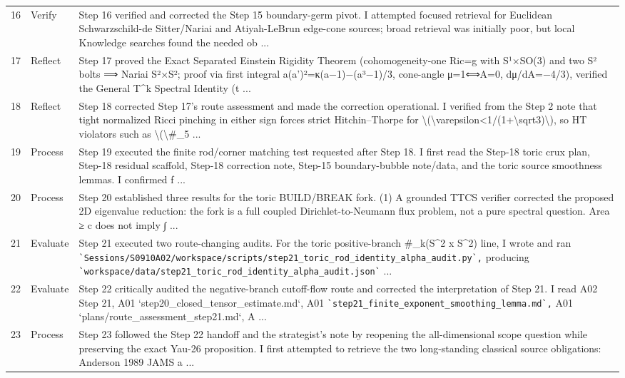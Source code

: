 \documentclass[UTF8,fontset=fandol,zihao=-4]{ctexart}
\begin{document}
\begin{longtable}{r p{} >{\raggedright\arraybackslash}p{}}
16 & Verify & Step 16 verified and corrected the Step 15 boundary-germ pivot. I attempted focused retrieval for Euclidean Schwarzschild-de Sitter/Nariai and Atiyah-LeBrun edge-cone sources; broad retrieval was initially poor, but local Knowledge searches found the needed ob ...\\
17 & Reflect & Step 17 proved the Exact Separated Einstein Rigidity Theorem (cohomogeneity-one Ric=g with S¹×SO(3) and two S² bolts ⟹ Nariai S²×S²; proof via first integral a(a')²=κ(a−1)−(a³−1)/3, cone-angle μ=1⟺A=0, dμ/dA=−4/3), verified the General T\textasciicircum{}k Spectral Identity (t ...\\
18 & Reflect & Step 18 corrected Step 17's route assessment and made the correction operational. I verified from the Step 2 note that tight normalized Ricci pinching in either sign forces strict Hitchin--Thorpe for \textbackslash{}(\textbackslash{}varepsilon<1/(1+\textbackslash{}sqrt3)\textbackslash{}), so HT violators such as \textbackslash{}(\textbackslash{}\#\_5 ...\\
19 & Process & Step 19 executed the finite rod/corner matching test requested after Step 18. I first read the Step-18 toric crux plan, Step-18 residual scaffold, Step-18 correction note, Step-15 boundary-bubble note/data, and the toric source smoothness lemmas. I confirmed f ...\\
20 & Process & Step 20 established three results for the toric BUILD/BREAK fork. (1) A grounded TTCS verifier corrected the proposed 2D eigenvalue reduction: the fork is a full coupled Dirichlet-to-Neumann flux problem, not a pure spectral question. Area ≥ c does not imply ∫ ...\\
21 & Evaluate & Step 21 executed two route-changing audits. For the toric positive-branch \#\_k(S\textasciicircum{}2 x S\textasciicircum{}2) line, I wrote and ran \nolinkurl{`Sessions/S0910A02/workspace/scripts/step21_toric_rod_identity_alpha_audit.py`,} producing \nolinkurl{`workspace/data/step21_toric_rod_identity_alpha_audit.json`} ...\\
22 & Evaluate & Step 22 critically audited the negative-branch cutoff-flow route and corrected the interpretation of Step 21. I read A02 Step 21, A01 `step20\_closed\_tensor\_estimate.md`, A01 \nolinkurl{`step21_finite_exponent_smoothing_lemma.md`,} A01 `plans/route\_assessment\_step21.md`, A ...\\
23 & Process & Step 23 followed the Step 22 handoff and the strategist’s note by reopening the all-dimensional scope question while preserving the exact Yau-26 proposition. I first attempted to retrieve the two long-standing classical source obligations: Anderson 1989 JAMS a ...\\

\end{longtable}
\end{document}
